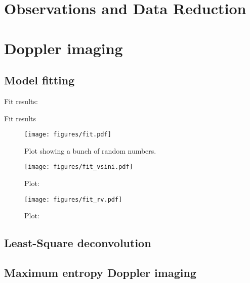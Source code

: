\documentclass[twocolumn]{aastex631}
\begin{document}
\section{Observations and Data Reduction}

\section{Doppler imaging}

\subsection{Model fitting}

Fit results:
\begin{table*}[ht!]
    \centering
    \caption{Fit results}
    \label{tab:my_table}
\end{table*}


\begin{figure*}[ht!]
    \begin{centering}
        \texttt{[image: figures/fit.pdf]}
        \caption{
            Plot showing a bunch of random numbers.
        }
        \label{fig:fit}
    \end{centering}
\end{figure*}

\begin{figure}[ht!]
    \begin{centering}
        \texttt{[image: figures/fit\_vsini.pdf]}
        \caption{Plot: }
        \label{fig:fit_vsini}
    \end{centering}
\end{figure}

\begin{figure}[ht!]
    \begin{centering}
        \texttt{[image: figures/fit\_rv.pdf]}
        \caption{Plot: }
        \label{fig:fit_rv}
    \end{centering}
\end{figure}


\subsection{Least-Square deconvolution}

\subsection{Maximum entropy Doppler imaging}
\end{document}
